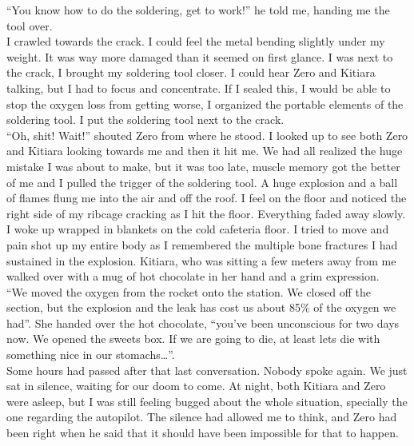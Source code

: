 \documentclass[a4paper,onecolumn,11pt]{article}
\begin{document}
\newline
``You know how to do the soldering, get to work!'' he told me, handing me the tool over. \\
\newline
I crawled towards the crack. I could feel the metal bending slightly under my weight. It was way more damaged than it seemed on first glance. I was next to the crack, I brought my soldering tool closer. I could hear Zero and Kitiara talking, but I had to focus and concentrate. If I sealed this, I would be able to stop the oxygen loss from getting worse, I organized the portable elements of the soldering tool. I put the soldering tool next to the crack.\\
\newline
``Oh, shit! Wait!'' shouted Zero from where he stood. I looked up to see both Zero and Kitiara looking towards me and then it hit me. We had all realized the huge mistake I was about to make, but it was too late, muscle memory got the better of me and I pulled the trigger of the soldering tool. A huge explosion and a ball of flames flung me into the air and off the roof. I feel on the floor and noticed the right side of my ribcage cracking as I hit the floor. Everything faded away slowly.\\
\newline
I woke up wrapped in blankets on the cold cafeteria floor. I tried to move and pain shot up my entire body as I remembered the multiple bone fractures I had sustained in the explosion. Kitiara, who was sitting a few meters away from me walked over with a mug of hot chocolate in her hand and a grim expression.\\
\newline
``We moved the oxygen from the rocket onto the station. We closed off the section, but the explosion and the leak has cost us about 85\% of the oxygen we had''. She handed over the hot chocolate, ``you've been unconscious for two days now. We opened the sweets box. If we are going to die, at least lets die with something nice in our stomachs\ldots''.\\
\newline
Some hours had passed after that last conversation. Nobody spoke again. We just sat in silence, waiting for our doom to come. At night, both Kitiara and Zero were asleep, but I was still feeling bugged about the whole situation, specially the one regarding the autopilot. The silence had allowed me to think, and Zero had been right when he said that it should have been impossible for that to happen.\\
\end{document}
